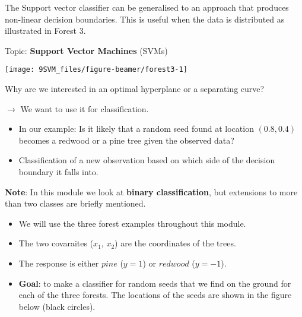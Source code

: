 \documentclass[10pt,ignorenonframetext,]{beamer}
\begin{document}
\begin{frame}

The Support vector classifier can be generalised to an approach that
produces non-linear decision boundaries. This is useful when the data is
distributed as illustrated in Forest 3.

Topic: \textbf{Support Vector Machines} (SVMs)

\begin{center}\texttt{[image: 9SVM\_files/figure-beamer/forest3-1]} \end{center}

\end{frame}

\begin{frame}

Why are we interested in an optimal hyperplane or a separating curve?

\(\rightarrow\) We want to use it for classification.

\begin{itemize}
\item
  In our example: Is it likely that a random seed found at location
  \((0.8,0.4)\) becomes a redwood or a pine tree given the observed
  data?
\item
  Classification of a new observation based on which side of the
  decision boundary it falls into.
\end{itemize}

\vspace{2mm}

\textbf{Note}: In this module we look at \textbf{binary classification},
but extensions to more than two classes are briefly mentioned.

\end{frame}

\begin{frame}

\begin{itemize}
\item
  We will use the three forest examples throughout this module.
\item
  The two covaraites (\(x_1\), \(x_2\)) are the coordinates of the
  trees.
\item
  The response is either \(pine\) (\(y=1\)) or \(redwood\) (\(y=-1\)).
\item
  \textbf{Goal}: to make a classifier for random seeds that we find on
  the ground for each of the three forests. The locations of the seeds
  are shown in the figure below (black circles).
\end{itemize}

\end{frame}
\end{document}
